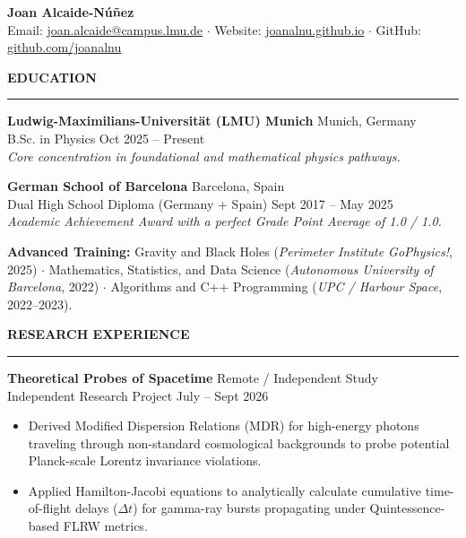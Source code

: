 \documentclass[10pt,a4paper]{article}
\newcommand{\cvsection}[1]{%
    \vspace{12pt}
    {\large\bfseries\MakeUppercase{#1}}
    \vspace{2pt}\hrule\vspace{5pt}
}
\begin{document}
\begin{center}
    {\LARGE \bfseries Joan Alcaide-Núñez} \\[3pt]
    \small
    Email: \href{mailto:joan.alcaide@campus.lmu.de}{joan.alcaide@campus.lmu.de} $\cdot$
    Website: \href{https://joanalnu.github.io}{joanalnu.github.io} $\cdot$
    GitHub: \href{https://github.com/joanalnu}{github.com/joanalnu}
\end{center}

\cvsection{Education}

\textbf{Ludwig-Maximilians-Universität (LMU) Munich} \hfill Munich, Germany \\
B.Sc. in Physics \hfill Oct 2025 -- Present \\
\textit{Core concentration in foundational and mathematical physics pathways.}

\vspace{5pt}

\textbf{German School of Barcelona} \hfill Barcelona, Spain \\
Dual High School Diploma (Germany + Spain) \hfill Sept 2017 -- May 2025 \\
\textit{Academic Achievement Award with a perfect Grade Point Average of 1.0 / 1.0.}

\vspace{5pt}

\textbf{Advanced Training:} Gravity and Black Holes (\textit{Perimeter Institute GoPhysics!}, 2025) $\cdot$ Mathematics, Statistics, and Data Science (\textit{Autonomous University of Barcelona}, 2022) $\cdot$ Algorithms and C++ Programming (\textit{UPC / Harbour Space}, 2022--2023).

\cvsection{Research Experience}

\textbf{Theoretical Probes of Spacetime} \hfill Remote / Independent Study \\
Independent Research Project \hfill July -- Sept 2026
\begin{itemize}
    \itemsep0em  
    \item Derived Modified Dispersion Relations (MDR) for high-energy photons traveling through non-standard cosmological backgrounds to probe potential Planck-scale Lorentz invariance violations.
    \item Applied Hamilton-Jacobi equations to analytically calculate cumulative time-of-flight delays ($\Delta t$) for gamma-ray bursts propagating under Quintessence-based FLRW metrics.
\end{itemize}
\end{document}
